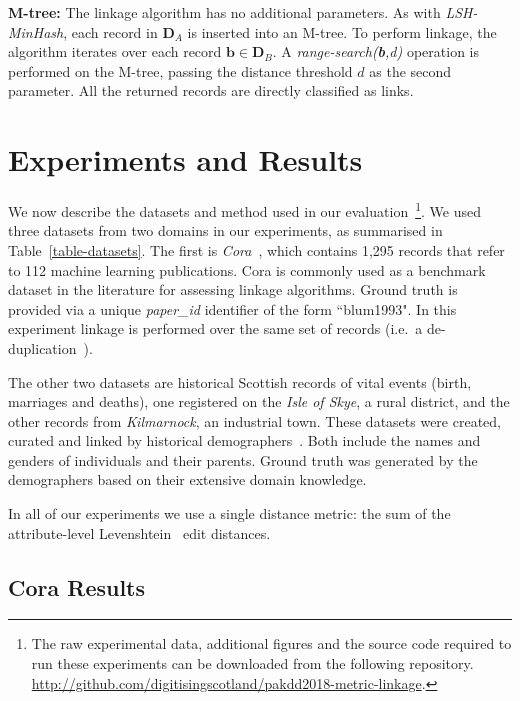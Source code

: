 \documentclass{llncs}
\begin{document}
\textbf{M-tree:} The linkage algorithm has no additional parameters. As
with \emph{LSH-MinHash}, each record in $\mathbf{D}_A$ is inserted into
an M-tree. To perform linkage, the algorithm iterates over each record
$\mathbf{b} \in \mathbf{D}_B$. A \emph{range-search(\textbf{b},d)}
operation is performed on the M-tree, passing the distance threshold $d$
as the second parameter. All the returned records are directly
classified as links.


\section{Experiments and Results}
\label{sec-exp}

We now describe the datasets and method used in our
evaluation~\footnote{The raw experimental data, additional figures and
the source code required to run these experiments can be downloaded
from the following repository. \\
\url{http://github.com/digitisingscotland/pakdd2018-metric-linkage}.}.
We used three datasets from two
domains in our experiments, as summarised in Table~\ref{table-datasets}.
The first is \emph{Cora}~\cite{Cora2017}, which contains 1,295 records
that refer to 112 machine learning publications. Cora is commonly used
as a benchmark dataset in the literature for assessing linkage
algorithms. Ground truth is provided via a unique \emph{paper\_id}
identifier of the form ``blum1993". In this experiment linkage is
performed over the same set of records (i.e.\ a
de-duplication~\cite{Chr12}).

The other two datasets are historical Scottish records of vital events
(birth, marriages and deaths), one registered on the \emph{Isle of
Skye}, a rural district, and the other records from \emph{Kilmarnock},
an industrial town. These datasets were created, curated and linked by
historical demographers~\cite{reid2006,reid2002}. Both include the names
and genders of individuals and their parents. Ground truth was generated
by the demographers based on their extensive domain knowledge.

In all of our experiments we use a single distance metric: the sum of
the attribute-level Levenshtein~\cite{Levenshtein66} edit distances.


\subsection{Cora Results}
\end{document}
